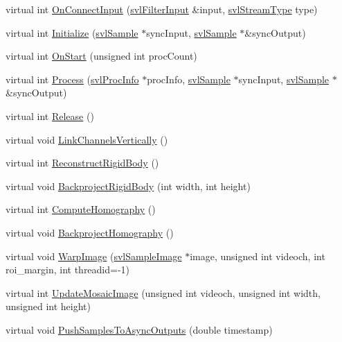 \begin{DoxyCompactItemize}
\item 
virtual int \hyperlink{classsvl_filter_image_tracker_aa56041f1f99e38c95e376fd4d86308e4}{On\+Connect\+Input} (\hyperlink{classsvl_filter_input}{svl\+Filter\+Input} \&input, \hyperlink{svl_definitions_8h_aa00696d338a58db361335a01fd11e122}{svl\+Stream\+Type} type)
\item 
virtual int \hyperlink{classsvl_filter_image_tracker_ae0c8005cdb37e4e23cedc872bcd0083b}{Initialize} (\hyperlink{classsvl_sample}{svl\+Sample} $\ast$sync\+Input, \hyperlink{classsvl_sample}{svl\+Sample} $\ast$\&sync\+Output)
\item 
virtual int \hyperlink{classsvl_filter_image_tracker_a4c02386dc5a53c4dc91cc366e0db88da}{On\+Start} (unsigned int proc\+Count)
\item 
virtual int \hyperlink{classsvl_filter_image_tracker_a5ddf75bff8a2ece8088f8535902d4311}{Process} (\hyperlink{structsvl_proc_info}{svl\+Proc\+Info} $\ast$proc\+Info, \hyperlink{classsvl_sample}{svl\+Sample} $\ast$sync\+Input, \hyperlink{classsvl_sample}{svl\+Sample} $\ast$\&sync\+Output)
\item 
virtual int \hyperlink{classsvl_filter_image_tracker_aad53f8b2ca1d2ba142d16b20ce10f7b2}{Release} ()
\item 
virtual void \hyperlink{classsvl_filter_image_tracker_a4d177432be2507264815d7bf4adec2a9}{Link\+Channels\+Vertically} ()
\item 
virtual int \hyperlink{classsvl_filter_image_tracker_aa52ae2fdec977aa7963c827405dc04f2}{Reconstruct\+Rigid\+Body} ()
\item 
virtual void \hyperlink{classsvl_filter_image_tracker_a6313371f45e2957035d4dd0ea0f042e6}{Backproject\+Rigid\+Body} (int width, int height)
\item 
virtual int \hyperlink{classsvl_filter_image_tracker_a1600c61731583046c9c7f79787e9017b}{Compute\+Homography} ()
\item 
virtual void \hyperlink{classsvl_filter_image_tracker_af97819e1b561eea75a255e2cfaf7ca78}{Backproject\+Homography} ()
\item 
virtual void \hyperlink{classsvl_filter_image_tracker_a199267feba07bc2ce085f87e8e35baa8}{Warp\+Image} (\hyperlink{classsvl_sample_image}{svl\+Sample\+Image} $\ast$image, unsigned int videoch, int roi\+\_\+margin, int threadid=-\/1)
\item 
virtual int \hyperlink{classsvl_filter_image_tracker_a121c3db787aea79abc62f0b94fd8bb84}{Update\+Mosaic\+Image} (unsigned int videoch, unsigned int width, unsigned int height)
\item 
virtual void \hyperlink{classsvl_filter_image_tracker_af773685cda7ce9b38a390ba82daebde0}{Push\+Samples\+To\+Async\+Outputs} (double timestamp)
\end{DoxyCompactItemize}
